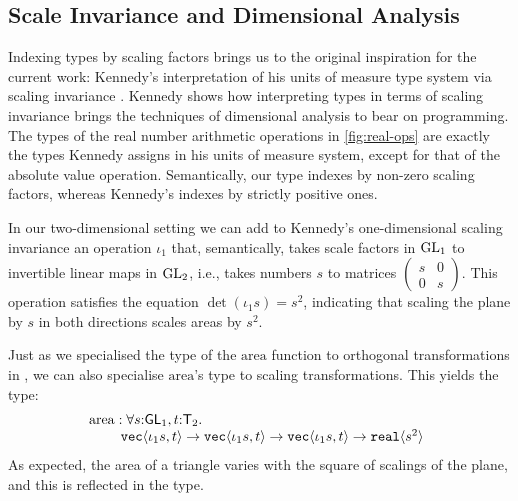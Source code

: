 
\subsection{Scale Invariance and Dimensional Analysis}
\label{sec:scale-invariance}

Indexing types by scaling factors brings us to the original
inspiration for the current work: Kennedy's interpretation of his
units of measure type system via scaling invariance
\cite{kennedy97relational}. Kennedy shows how interpreting types in
terms of scaling invariance brings the techniques of dimensional
analysis to bear on programming. The types of the real number
arithmetic operations in \autoref{fig:real-ops} are exactly the types
Kennedy assigns in his units of measure system, except for that of the
absolute value operation. Semantically, our type indexes by
non-zero scaling factors, whereas Kennedy's indexes by strictly
positive ones. 

In our two-dimensional setting we can add to Kennedy's one-dimensional
scaling invariance an operation $\iota_1$ that, semantically, takes
scale factors in $\mathrm{GL}_1$ to invertible linear maps in $\mathrm{GL}_2$,
i.e., takes numbers $s$ to matrices $\left(
  \begin{smallmatrix}s & 0 \\ 0 & s\end{smallmatrix}\right)$.  This
operation satisfies the equation $\det (\iota_1 s) = s^2$, indicating
that scaling the plane by $s$ in both directions scales areas by
$s^2$. %

\begin{example}\label{ex:area-of-triangle-2}
  Just as we specialised the type of the $\mathrm{area}$ function to
  orthogonal transformations in , we can
  also specialise $\mathrm{area}$'s type to scaling
  transformations. This yields the type:
  \begin{displaymath}
    \begin{array}{@{}l}
      \mathrm{area} : \forall s\mathord:\SynGL{1}, t\mathord:\SynTransl{2}.\ \\
      \hspace{0.8cm} \tyPrim{vec}{\iota_1s, t} \to \tyPrim{vec}{\iota_1s, t} \to \tyPrim{vec}{\iota_1s, t} \to \tyPrim{real}{s^2}
    \end{array}
  \end{displaymath}
  As expected, the area of a triangle varies with the square of
  scalings of the plane, and this is reflected in the type.
\end{example}

